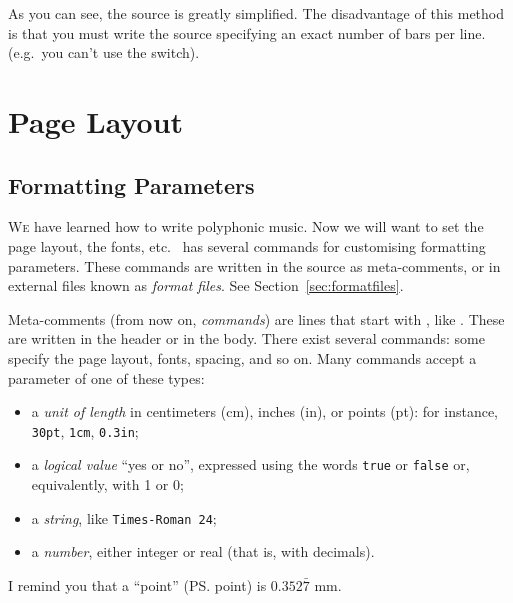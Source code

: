 \documentclass[a4paper,fullpage,12pt]{book}
\begin{document}

As you can see, the source is greatly simplified. The disadvantage of
this method is that you must write the source specifying an exact
number of bars per line. (e.g.\ you can't use the  switch).


\noteseparator


\chapter{Page Layout}

\section{Formatting Parameters}
\label{sec:format}

\lettrine{W}{e} have learned how to write polyphonic music. Now we
will want to set the page layout, the fonts, etc.\ \abcm{} has several
commands for customising formatting parameters. These commands are
written in the source as meta-comments, or in external files known as
\emph{format files}. See Section~\ref{sec:formatfiles}.

Meta-comments (from now on, \emph{commands}) are lines that start with
\metacmd{}, like . These are written in the header or
in the body. There exist several commands: some specify the page
layout, fonts, spacing, and so on. Many commands accept a parameter of
one of these types:

\begin{itemize}
  
  \item a \emph{unit of length} in centimeters (cm), inches (in),
  or points (pt): for instance, \texttt{30pt}, \texttt{1cm},
  \texttt{0.3in};
  
  \item a \emph{logical value} ``yes or no'', expressed using the words
  \texttt{true} or \texttt{false} or, equivalently, with 1 or 0;
  
  \item a \emph{string}, like \texttt{Times-Roman 24};
  
  \item a \emph{number}, either integer or real (that is, with decimals).
  
\end{itemize}

I remind you that a ``point'' (\ps{} point) is $0.352\bar{7}$ mm.
\end{document}

